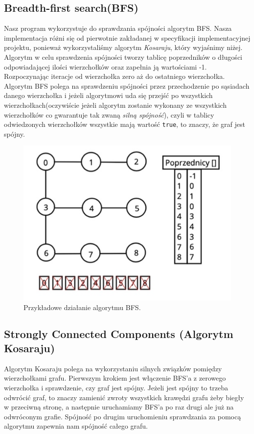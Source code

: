 \documentclass[10pt, a4paper]{report}
\begin{document}
\subsection{Breadth-first search(BFS)}\label{subsec:breadth-first-search(bfs)}
Nasz program wykorzystuje do sprawdzania spójności algorytm BFS. Nasza
implementacja różni się od pierwotnie zakładanej w specyfikacji
implementacyjnej
projektu, ponieważ wykorzystaliśmy algorytm \textit{Kosaraju}, który wyjaśnimy
niżej.
Algorytm w celu sprawdzenia spójności tworzy tablicę poprzedników o długości
odpowiadającej ilości wierzchołków
oraz zapełnia ją wartościami -1. Rozpoczynając iteracje od wierzchołka zero aż
do ostatniego wierzchołka.
Algorytm BFS polega na sprawdzeniu spójności przez przechodzenie po sąsiadach
danego wierzchołka i jeżeli algorytmowi uda się
przejść po wszystkich wierzchołkach(oczywiście jeżeli algorytm zostanie
wykonany ze wszystkich wierzchołków co gwarantuje tak zwaną \textit{silną
  spójność}), czyli w tablicy odwiedzonych wierzchołków wszystkie mają wartość
\texttt{true}, to znaczy, że graf jest spójny.
\begin{figure}[h]
  \begin{center}
    \includegraphics[scale=0.5]{bfs.png}
    \caption{Przykładowe działanie algorytmu BFS.}
  \end{center}
\end{figure}
\newpage

\subsection{Strongly Connected Components (Algorytm Kosaraju)}\label{subsec:kosaraju}
Algorytm Kosaraju polega na wykorzystaniu silnych związków pomiędzy
wierzchołkami grafu. Pierwszym krokiem jest włączenie BFS'a z zerowego
wierzchołka i sprawdzenie, czy graf jest spójny.
Jeżeli jest spójny to trzeba odwrócić graf, to znaczy zamienić zwroty
wszystkich krawędzi grafu żeby biegły w przeciwną stronę, a następnie
uruchamiamy BFS'a po raz drugi ale już na odwróconym grafie.
Spójność po drugim uruchomieniu sprawdzania za pomocą algorytmu zapewnia nam
spójność całego grafu.
\end{document}
